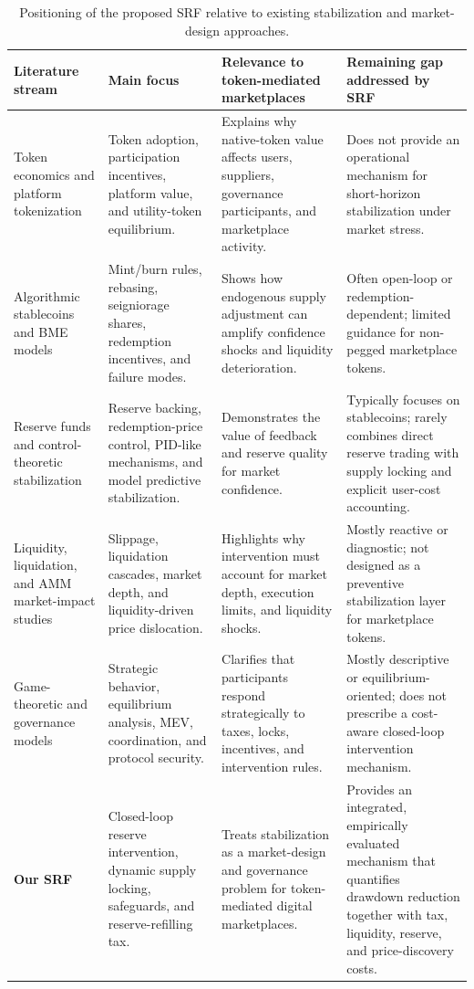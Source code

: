 \documentclass[a4paper,fleqn]{cas-dc}
\begin{document}
\begin{table}[htbp]
\centering
\caption{Positioning of the proposed SRF relative to existing stabilization and market-design approaches.}
\label{tab:related_comparison}
\begin{tabular}{|p{3.2cm}|p{3.7cm}|p{4.0cm}|p{4.1cm}|}
\hline
\textbf{Literature stream} & \textbf{Main focus} & \textbf{Relevance to token-mediated marketplaces} & \textbf{Remaining gap addressed by SRF} \\
\hline
Token economics and platform tokenization & Token adoption, participation incentives, platform value, and utility-token equilibrium. & Explains why native-token value affects users, suppliers, governance participants, and marketplace activity. & Does not provide an operational mechanism for short-horizon stabilization under market stress. \\
\hline
Algorithmic stablecoins and BME models & Mint/burn rules, rebasing, seigniorage shares, redemption incentives, and failure modes. & Shows how endogenous supply adjustment can amplify confidence shocks and liquidity deterioration. & Often open-loop or redemption-dependent; limited guidance for non-pegged marketplace tokens. \\
\hline
Reserve funds and control-theoretic stabilization & Reserve backing, redemption-price control, PID-like mechanisms, and model predictive stabilization. & Demonstrates the value of feedback and reserve quality for market confidence. & Typically focuses on stablecoins; rarely combines direct reserve trading with supply locking and explicit user-cost accounting. \\
\hline
Liquidity, liquidation, and AMM market-impact studies & Slippage, liquidation cascades, market depth, and liquidity-driven price dislocation. & Highlights why intervention must account for market depth, execution limits, and liquidity shocks. & Mostly reactive or diagnostic; not designed as a preventive stabilization layer for marketplace tokens. \\
\hline
Game-theoretic and governance models & Strategic behavior, equilibrium analysis, MEV, coordination, and protocol security. & Clarifies that participants respond strategically to taxes, locks, incentives, and intervention rules. & Mostly descriptive or equilibrium-oriented; does not prescribe a cost-aware closed-loop intervention mechanism. \\
\hline
\textbf{Our SRF} & Closed-loop reserve intervention, dynamic supply locking, safeguards, and reserve-refilling tax. & Treats stabilization as a market-design and governance problem for token-mediated digital marketplaces. & Provides an integrated, empirically evaluated mechanism that quantifies drawdown reduction together with tax, liquidity, reserve, and price-discovery costs. \\
\hline
\end{tabular}
\end{table}
\end{document}
